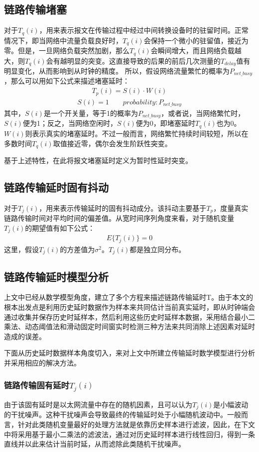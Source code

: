 \subsection{链路传输堵塞}
对于$T_{q}(i)$，用来表示报文在传输过程中经过中间转换设备时的驻留时间。正常情况下，即当网络中流量负载良好时，$T_{q}(i)$会保持一个微小的驻留值，接近为零。但是，一旦网络负载突然加剧，那么$T_{q}(i)$会瞬间增大，而且网络负载越大，则$T_{q}(i)$会有越明显的突变。这直接导致的后果的前后几次测量的$T_{delay}$值有明显变化，从而影响到从时钟的精度。
所以，假设网络流量繁忙的概率为$P_{net\_busy}$，那么可以用如下公式来描述堵塞延时：
\begin {align}
T_{p}(i) = S(i) \cdot W(i) 
\end{align}
\begin {align}
S(i) = 1 \qquad probability: P_{net\_busy}
\end{align}
其中，$S(i)$是一个开关量，等于1的概率为$P_{net\_busy}$，或者说，当网络繁忙时，$S(i)$便为1；反之，当网络空闲时，$S(i)$便为0，即堵塞延时$T_{q}(i)$也为0。$W(i)$则表示真实的堵塞延时。不过一般而言，网络繁忙持续时间较短，所以在多数时间$T_{q}(i)$取值接近零，偶尔会发生阶跃性突变。

基于上述特性，在此将报文堵塞延时定义为暂时性延时突变。

\subsection{链路传输延时固有抖动}
对于$T_{j}(i)$，用来表示传输延时的固有抖动成分。该抖动主要基于$T_{p}$，度量真实链路传输时间对平均时间的偏差值。从宽时间序列角度来看，对于随机变量$T_{j}(i)$的期望值有如下公式\supercite{33}：
\begin {align}
E\{T_{j}(i)\} = 0
\end {align}
这里，假设$T_{j}(i)$的方差值为$\sigma ^{2}$。$T_{j}(i)$都是独立同分布。

\subsection{链路传输延时模型分析}
上文中已经从数学模型角度，建立了多个方程来描述链路传输延时T。由于本文的根本出发点是利用历史延时数据作为样本来共同估计当前真实延时，即从时钟端会通过收集并保存历史时延样本，然后利用这些历史时延样本数据，采用结合最小二乘法、动态阈值法和滑动固定时间窗实时检测三种方法来共同消除上述因素对延时造成的误差。

下面从历史延时数据样本角度切入，来对上文中所建立传输延时数学模型进行分析并采用相应的解决方法。

\subsubsection{链路传输固有延时$T_{j}(i)$}
由于该固有延时是以太网流量中存在的随机因素，且可以认为$T_{j}(i)$是小幅波动的干扰噪声。这种干扰噪声会导致最终的传输延时处于小幅随机波动中。一般而言，针对此类随机变量最好的处理方法就是依靠历史样本进行滤波，因此，在下文中将采用基于最小二乘法的滤波法，通过对历史延时样本进行线性回归，得到一条直线并以此来估计当前时延，从而滤除此类随机干扰噪声。

